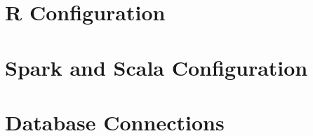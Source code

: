 \documentclass[letterpaper]{article}
\begin{document}

\section{R Configuration}
\bigskip

\lipsum[4]


% 
% 
% 
% 
% 
% 
% 
% 
% 
% 
% 
% 
% 
% 
% 
% 


\section{Spark and Scala Configuration}
\bigskip

\lipsum[5]


% 
% 
% 
% 
% 
% 
% 
% 
% 
% 
% 
% 
% 
% 
% 
% 


\section{Database Connections}
\bigskip

\lipsum[6]


% 
% 
% 
% 
% 
% 
% 
% 
% 
% 
% 
% 
% 
% 
% 
% 
\end{document}
